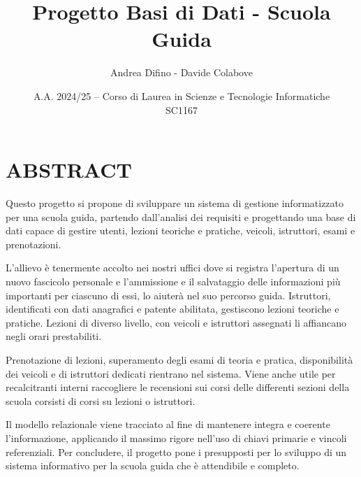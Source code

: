 \documentclass[10pt]{article}
\author{Andrea Difino - Davide Colabove}
\date{A.A. 2024/25 -- Corso di Laurea in Scienze e Tecnologie Informatiche\\SC1167}
\begin{document}
\title{Progetto Basi di Dati - Scuola Guida}
\maketitle

\section{ABSTRACT}{
    Questo progetto si propone di sviluppare un sistema di gestione informatizzato per una scuola guida, partendo dall’analisi dei requisiti e progettando una base di dati capace di gestire utenti, lezioni teoriche e pratiche, veicoli, istruttori, esami e prenotazioni.

    L'allievo è tenermente accolto nei nostri uffici dove si registra l'apertura di un nuovo fascicolo personale e l'ammissione e il salvataggio delle informazioni più importanti per ciascuno di essi, lo aiuterà nel suo percorso guida. Istruttori, identificati con dati anagrafici e patente abilitata, gestiscono lezioni teoriche e pratiche. Lezioni di diverso livello, con veicoli e istruttori assegnati li affiancano negli orari prestabiliti.

    Prenotazione di lezioni, superamento degli esami di teoria e pratica, disponibilità dei veicoli e di istruttori dedicati rientrano nel sistema. Viene anche utile per recalcitranti interni raccogliere le recensioni sui corsi delle differenti sezioni della scuola corsisti di corsi su lezioni o istruttori.

    Il modello relazionale viene tracciato al fine di mantenere integra e coerente l'informazione, applicando il massimo rigore nell'uso di chiavi primarie e vincoli referenziali. Per concludere, il progetto pone i presupposti per lo sviluppo di un sistema informativo per la scuola guida che è attendibile e completo.
}
\end{document}
